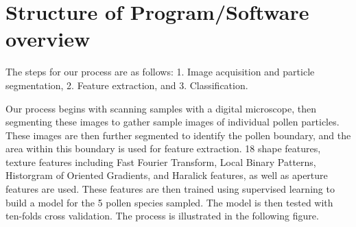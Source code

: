 \section{Structure of Program/Software overview} 

The steps for our process are as follows: 1. Image acquisition and particle segmentation, 2. Feature extraction, and 3. Classification.

Our process begins with scanning samples with a digital microscope, then segmenting these images to gather sample images of individual pollen particles. These images are then further segmented to identify the pollen boundary, and the area within this boundary is used for feature extraction. 18 shape features, texture features including Fast Fourier Transform, Local Binary Patterns, Historgram of Oriented Gradients, and Haralick features, as well as aperture features are used. These features are then trained using supervised learning to build a model for the 5 pollen species sampled. The model is then tested with ten-folds cross validation. The process is illustrated in the following figure. 
    
    
    
    
    
    
    
    
    
    
    
    
  
  
  
  
  
  
  
  